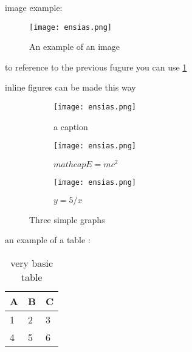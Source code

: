 image example:

\begin{figure}[h]
\centering
\texttt{[image: ensias.png]}
\caption{An example of an image}
\label{fig : ensias logo}
\end{figure}

to reference to the previous fugure you can use \ref{fig : ensias logo}

inline figures can be made this way 
\begin{figure}[h]
     \centering
     \begin{subfigure}[b]{0.3\textwidth}
         \centering
         \texttt{[image: ensias.png]}
         \caption{a caption}
         \label{fig:y equals x}
     \end{subfigure}
     \hfill
     \begin{subfigure}[b]{0.3\textwidth}
         \centering
         \texttt{[image: ensias.png]}
         \caption{$math cap E=mc^2$}
         \label{fig:three sin x}
     \end{subfigure}
     \hfill
     \begin{subfigure}[b]{0.3\textwidth}
         \centering
         \texttt{[image: ensias.png]}
         \caption{$y=5/x$}
         \label{fig:five over x}
     \end{subfigure}
        \caption{Three simple graphs}
        \label{fig:three graphs}
\end{figure}

an example of a table :

\begin{table}[h]
\centering
\begin{tabular}{||l | l | l||}
\hline
A & B & C \\
\hline
1 & 2 & 3 \\
4 & 5 & 6 \\
\hline
\hline
\end{tabular}
\caption{very basic table}
\label{tab:abc}
\end{table}
